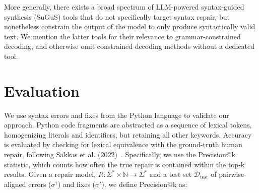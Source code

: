 \documentclass[runningheads]{llncs}
\newcommand{\cmark}{\ding{51}}%
\newcommand{\xmark}{\ding{55}}%
\begin{document}
More generally, there exists a broad spectrum of LLM-powered syntax-guided synthesis (SuGuS) tools that do not specifically target syntax repair, but nonetheless constrain the output of the model to only produce syntactically valid text. We mention the latter tools for their relevance to grammar-constrained decoding, and otherwise omit constrained decoding methods without a dedicated tool.

%


%
%
%

\section{Evaluation}

We use syntax errors and fixes from the Python language to validate our approach. Python code fragments are abstracted as a sequence of lexical tokens, homogenizing literals and identifiers, but retaining all other keywords. Accuracy is evaluated by checking for lexical equivalence with the ground-truth human repair, following Sakkas et al. (2022)~\cite{sakkas2022seq2parse}. Specifically, we use the Precision@k statistic, which counts how often the true repair is contained within the top-k results. Given a repair model, $R: \Sigma^* \times \mathbb{N} \rightarrow \Sigma^*$ and a test set $\mathcal{D}_{\text{test}}$ of pairwise-aligned errors ($\sigma^\dagger$) and fixes ($\sigma'$), we define Precision@k as:
\end{document}
